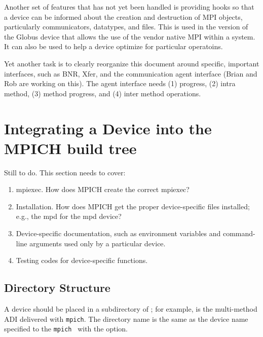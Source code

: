 \documentclass{article}
\newcommand{\mpich}{\texttt{mpich}}
\begin{document}
Another set of features that has not yet been handled is providing
hooks so that a device can be informed about the creation and
destruction of MPI objects, particularly communicators, datatypes, and
files.  This is used in the version of the Globus device that allows
the use of the vendor native MPI within a system.  It can also be used
to help a device optimize for particular operatoins.

Yet another task is to clearly reorganize this document around
specific, important interfaces, such as BNR, Xfer, and the
communication agent interface (Brian and Rob are working on this).
The agent interface needs (1) progress, (2) intra method, (3) method
progress, and (4) inter method operations.


%

%


\section{Integrating a Device into the MPICH build tree}
Still to do.  This section needs to cover:
\begin{enumerate}
\item mpiexec.  How does MPICH create the correct mpiexec?
\item Installation.  How does MPICH get the proper device-specific files
  installed; e.g., the mpd for the mpd device?
\item Device-specific documentation, such as environment variables and
  command-line arguments used only by a particular device.
\item Testing codes for device-specific functions.
\end{enumerate}

\subsection{Directory Structure}
\label{sec:adi3-dirs}
A device should be placed in a subdirectory of ;
for example,  is the multi-method ADI
delivered with \mpich.  The directory name is the same as the device
name specified to the \mpich\  with the
 option.
\end{document}
